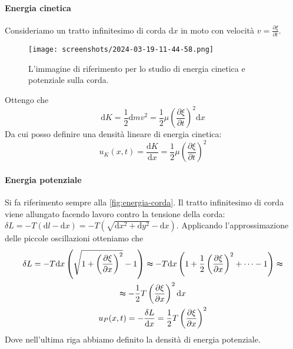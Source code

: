 \paragraph{Energia cinetica}
Consideriamo un tratto infinitesimo di corda \(\mathrm{d} x\) in moto con velocità \(v=\frac{\partial \xi }{\partial t} \). 
\begin{figure}[H]
	\centering
	\texttt{[image: screenshots/2024-03-19-11-44-58.png]}
	\caption{L'immagine di riferimento per lo studio di energia cinetica e potenziale sulla corda.}
	\label{fig:energia-corda}
\end{figure}
Ottengo che 
\[
	\mathrm{d} K = \frac{1}{2} \mathrm{d} m v ^{2} = \frac{1}{2} \mu \left( \frac{\partial \xi }{\partial t}  \right) ^{2} \mathrm{d} x
\]
Da cui posso definire una densità lineare di energia cinetica:
\[
	u_K(x,t) = \frac{\mathrm{d}K}{\mathrm{d}x} = \frac{1}{2} \mu \left( \frac{\partial \xi }{\partial t}  \right) ^{2} 
\]

\paragraph{Energia potenziale}

Si fa riferimento sempre alla \autoref{fig:energia-corda}. Il tratto infinitesimo di corda viene allungato facendo lavoro contro la tensione della corda: \(\delta L = -T (\mathrm{d}l - \mathrm{d} x ) = -T(\sqrt{\mathrm{d}x^{2} + \mathrm{d} y ^{2}   } - \mathrm{d} x )\). Applicando l'approssimazione delle piccole oscillazioni otteniamo che
\begin{gather*}
	\delta L = -T \mathrm{d} x \left( \sqrt{1+ \left( \frac{\partial \xi }{\partial x}  \right)^{2}  } -1  \right) \thickapprox -T \mathrm{d} x \left( 1+\frac{1}{2} \left( \frac{\partial \xi }{\partial x}  \right)^{2} + \cdots - 1  \right) \thickapprox \\
	\thickapprox -\frac{1}{2}T \left( \frac{\partial \xi }{\partial x}  \right)^{2} \mathrm{d} x\\
	u_P(x,t) = -\frac{\delta L}{\mathrm{d} x} = \frac{1}{2}T\left( \frac{\partial \xi }{\partial x}  \right) ^{2} 
\end{gather*}
Dove nell'ultima riga abbiamo definito la densità di energia potenziale.

